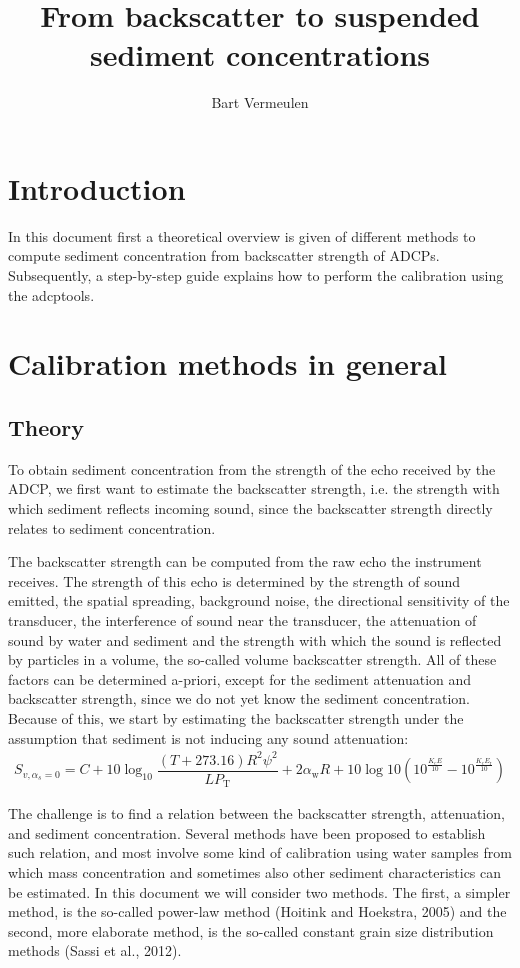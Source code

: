 \documentclass[]{article}
\title{From backscatter to suspended sediment concentrations}
\author{Bart Vermeulen}
\begin{document}
\maketitle
\tableofcontents
\section{Introduction}
In this document first a theoretical overview is given of different methods to compute sediment concentration from backscatter strength of ADCPs. Subsequently, a step-by-step guide explains how to perform the calibration using the adcptools.

\section{Calibration methods in general}
\subsection{Theory}
\label{sec:general_theory}
To obtain sediment concentration from the strength of the echo received by the ADCP, we first want to estimate the backscatter strength, i.e. the strength with which sediment reflects incoming sound, since the backscatter strength directly relates to sediment concentration. 

The backscatter strength can be computed from the raw echo the instrument receives. The strength of this echo is determined by the strength of sound emitted, the spatial spreading, background noise, the directional sensitivity of the transducer, the interference of sound near the transducer, the attenuation of sound by water and sediment and the strength with which the sound is reflected by particles in a volume, the so-called volume backscatter strength.  All of these factors can be determined a-priori, except for the sediment attenuation and backscatter strength, since we do not yet know the sediment concentration. Because of this, we start by estimating the backscatter strength under the assumption that sediment is not inducing any sound attenuation:
\begin{align}
  S_{v,\alpha_s=0}= C + 10\log_{10}\dfrac{(T+273.16)R^2 \psi^2}{LP_\text{T}}  + 2\alpha_\text{w}R + 10\log10\left(10^{\frac{K_\text{c}E}{10}}-10^{\frac{K_\text{c}E_\text{r}}{10}}\right)
\end{align}

The challenge is to find a relation between the backscatter strength, attenuation, and sediment concentration. Several methods have been proposed to establish such relation, and most involve some kind of calibration using water samples from which mass concentration and sometimes also other sediment characteristics can be estimated.
In this document we will consider two methods. The first, a simpler method, is the so-called power-law method (Hoitink and Hoekstra, 2005) and the second, more elaborate method, is the so-called constant grain size distribution methods (Sassi et al., 2012).
\end{document}
